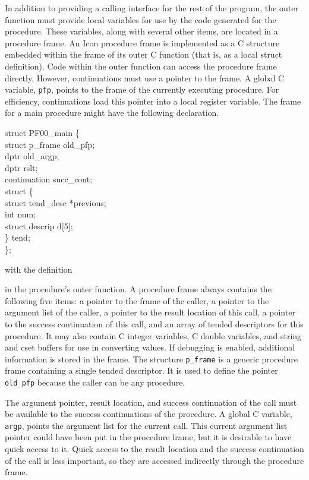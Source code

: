 In addition to providing a calling interface for the rest of the
program, the outer function must provide local variables for use by
the code generated for the procedure. These variables, along with
several other items, are located in a procedure frame. An Icon
procedure frame is implemented as a C structure embedded within the
frame of its outer C function (that is, as a local struct
definition). Code within the outer function can access the procedure
frame directly. However, continuations must use a pointer to the
frame. A global C variable, \texttt{pfp}, points to the frame of the currently
executing procedure. For efficiency, continuations load this pointer
into a local register variable. The frame for a main procedure might
have the following declaration.

\goodbreak
\begin{iconcode}
struct PF00\_main \{\\
\>struct p\_frame old\_pfp;\\
\>dptr old\_argp;\\
\>dptr rslt;\\
\>continuation succ\_cont;\\
\>struct \{\\
\>\>struct tend\_desc *previous;\\
\>\>int num;\\
\>\>struct descrip d[5];\\
\>\>\} tend;\\
\>\};\\
\end{iconcode}

\noindent with the definition


\noindent in the procedure's outer function. A procedure frame always
contains the following five items: a pointer to the frame of the
caller, a pointer to the argument list of the caller, a pointer to the
result location of this call, a pointer to the success continuation of
this call, and an array of tended descriptors for this procedure. It
may also contain C integer variables, C double variables, and string
and cset buffers for use in converting values. If debugging is
enabled, additional information is stored in the frame. The structure
\texttt{p\_frame} is a generic procedure frame containing a single
tended descriptor. It is used to define the pointer \texttt{old\_pfp}
because the caller can be any procedure.

The argument pointer, result location, and success continuation of the
call must be available to the success continuations of the
procedure. A global C variable, \texttt{argp}, points the argument list for the
current call. This current argument list pointer could have been put
in the procedure frame, but it is desirable to have quick access to
it. Quick access to the result location and the success continuation
of the call is less important, so they are accessed indirectly through
the procedure frame.

